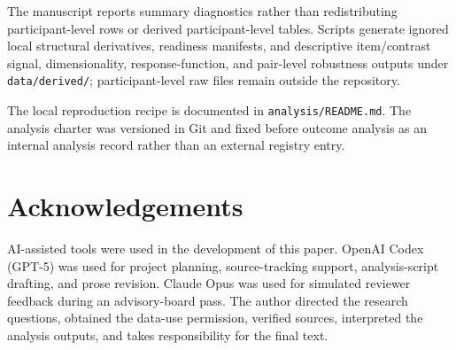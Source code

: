 \documentclass[12pt]{article}
\begin{document}
The manuscript reports summary diagnostics rather than redistributing
participant-level rows or derived participant-level tables. Scripts generate
ignored local structural derivatives, readiness manifests, and descriptive
item/contrast signal, dimensionality, response-function, and pair-level
robustness outputs under \texttt{data/derived/}; participant-level raw files
remain outside the repository.

The local reproduction recipe is documented in \texttt{analysis/README.md}. The
analysis charter was versioned in Git and fixed before outcome analysis as an
internal analysis record rather than an external registry entry.

\section*{Acknowledgements}

AI-assisted tools were used in the development of this paper. OpenAI Codex
(GPT-5) was used for project planning, source-tracking support, analysis-script
drafting, and prose revision. Claude Opus was used for simulated reviewer
feedback during an advisory-board pass. The author directed the research
questions, obtained the data-use permission, verified sources, interpreted the
analysis outputs, and takes responsibility for the final text.

\clearpage
\printbibliography
\end{document}

